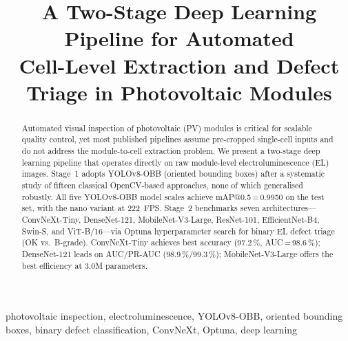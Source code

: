 \documentclass[conference]{IEEEtran}
\begin{document}
\title{A Two-Stage Deep Learning Pipeline for Automated\\
Cell-Level Extraction and Defect Triage in Photovoltaic Modules%
}

\author{%
\and
{}
}

\maketitle

\begin{abstract}
Automated visual inspection of photovoltaic (PV) modules is critical for scalable quality control, yet most published pipelines assume pre-cropped single-cell inputs and do not address the module-to-cell extraction problem. We present a two-stage deep learning pipeline that operates directly on raw module-level electroluminescence (EL) images. Stage~1 adopts YOLOv8-OBB (oriented bounding boxes) after a systematic study of fifteen classical OpenCV-based approaches, none of which generalised robustly. All five YOLOv8-OBB model scales achieve mAP@0.5\,=\,0.9950 on the test set, with the nano variant at 222~FPS. Stage~2 benchmarks seven architectures---ConvNeXt-Tiny, DenseNet-121, MobileNet-V3-Large, ResNet-101, EfficientNet-B4, Swin-S, and ViT-B/16---via Optuna hyperparameter search for binary EL defect triage (OK vs.\ B-grade). ConvNeXt-Tiny achieves best accuracy (97.2\,\%, AUC\,=\,98.6\,\%); DenseNet-121 leads on AUC/PR-AUC (98.9\,\%/99.3\,\%); MobileNet-V3-Large offers the best efficiency at 3.0M parameters.
\end{abstract}

\begin{IEEEkeywords}
photovoltaic inspection, electroluminescence, YOLOv8-OBB, oriented bounding boxes, binary defect classification, ConvNeXt, Optuna, deep learning
\end{IEEEkeywords}
\end{document}
